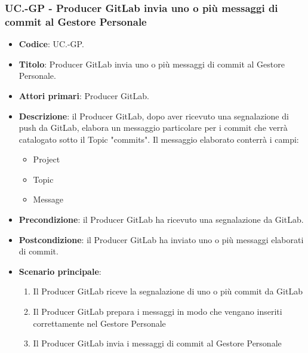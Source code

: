 	\subsubsection{UC\theuccount.\thesubuccount-GP - Producer GitLab invia uno o più messaggi di commit al Gestore Personale}
		
		\begin{itemize}
			\item \textbf{Codice}: UC\theuccount.\thesubuccount-GP.
			\item \textbf{Titolo}: Producer GitLab invia uno o più messaggi di commit al Gestore Personale.
			\item \textbf{Attori primari}: Producer GitLab.
			\item \textbf{Descrizione}: il Producer GitLab, dopo aver ricevuto una segnalazione di push da  \newline GitLab, elabora un messaggio particolare per i commit che verrà catalogato sotto il Topic "commits".
			Il messaggio elaborato conterrà i campi:
			\begin{itemize}
				\item Project
				\item Topic
				\item Message
			\end{itemize}
			\item \textbf{Precondizione}: il Producer GitLab ha ricevuto una segnalazione da GitLab.
			\item \textbf{Postcondizione}: il Producer GitLab ha inviato uno o più messaggi elaborati di commit.
			\item \textbf{Scenario principale}: 
			\begin{enumerate}
				\item Il Producer GitLab riceve la segnalazione di uno o più commit da GitLab
				\item Il Producer GitLab prepara i messaggi in modo che vengano inseriti correttamente nel Gestore Personale
				\item Il Producer GitLab invia i messaggi di
				commit al Gestore Personale
			\end{enumerate}
			
		\end{itemize}
		
